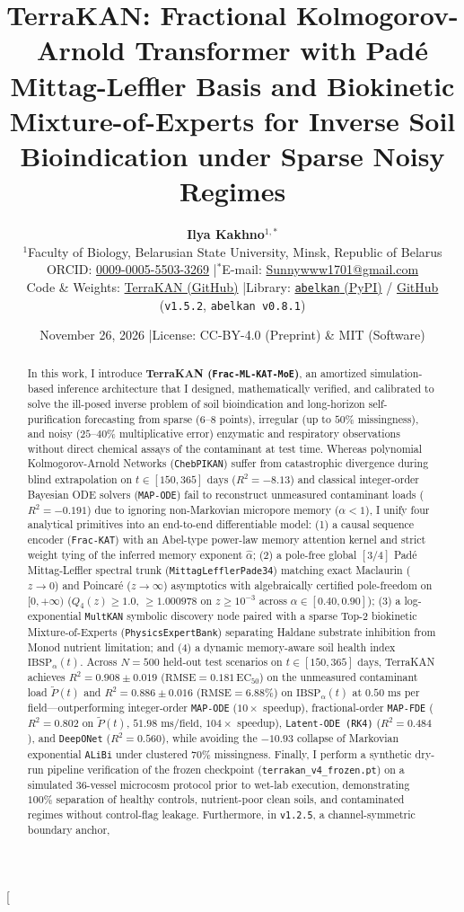 \documentclass[10pt,twocolumn,a4paper]{article}
\title{\vspace*{-7mm}\textbf{\Large TerraKAN: Fractional Kolmogorov-Arnold Transformer with Pad\'e Mittag-Leffler Basis and Biokinetic Mixture-of-Experts for Inverse Soil Bioindication under Sparse Noisy Regimes}}
\author{
  \textbf{Ilya Kakhno}$^{1,*}$ \\
  \small $^{1}$Faculty of Biology, Belarusian State University, Minsk, Republic of Belarus \\
  \small ORCID: \href{https://orcid.org/0009-0005-5503-3269}{0009-0005-5503-3269} \quad|\quad $^{*}$E-mail: \href{mailto:Sunnywww1701@gmail.com}{Sunnywww1701@gmail.com} \\
  \small Code \& Weights: \href{https://github.com/Lolycut/TerraKAN}{TerraKAN (GitHub)} \quad|\quad Library: \href{https://pypi.org/project/abelkan/}{\texttt{abelkan} (PyPI)} / \href{https://github.com/Lolycut/abelkan}{GitHub}  \quad (\texttt{v1.5.2}, \texttt{abelkan v0.8.1})
}
\date{\small November 26, 2026 \quad|\quad License: CC-BY-4.0 (Preprint) \& MIT (Software)}
\begin{document}
\twocolumn[
  \begin{@twocolumnfalse}
    \maketitle
    \vspace*{-4mm}
    \begin{abstract}
      \noindent
      In this work, I introduce \textbf{TerraKAN (\texttt{Frac-ML-KAT-MoE})}, an amortized simulation-based inference architecture that I designed, mathematically verified, and calibrated to solve the ill-posed inverse problem of soil bioindication and long-horizon self-purification forecasting from sparse ($6\text{--}8$ points), irregular (up to $50\%$ missingness), and noisy ($25\text{--}40\%$ multiplicative error) enzymatic and respiratory observations without direct chemical assays of the contaminant at test time. Whereas polynomial Kolmogorov-Arnold Networks (\texttt{ChebPIKAN}) suffer from catastrophic divergence during blind extrapolation on $t \in {[150, 365]}\text{ days}$ ($R^2 = -8.13$) and classical integer-order Bayesian ODE solvers (\texttt{MAP-ODE}) fail to reconstruct unmeasured contaminant loads ($R^2 = -0.191$) due to ignoring non-Markovian micropore memory ($\alpha < 1$), I unify four analytical primitives into an end-to-end differentiable model: (1) a causal sequence encoder (\texttt{Frac-KAT}) with an Abel-type power-law memory attention kernel and strict weight tying of the inferred memory exponent $\hat{\alpha}$; (2) a pole-free global ${[3/4]}$ Pad\'e Mittag-Leffler spectral trunk (\texttt{MittagLefflerPade34}) matching exact Maclaurin ($z \to 0$) and Poincar\'e ($z \to \infty$) asymptotics with algebraically certified pole-freedom on $[0, +\infty)$ ($Q_4(z) \ge 1.0$, $\ge 1.000978$ on $z \ge 10^{-3}$ across $\alpha \in {[0.40, 0.90]}$); (3) a log-exponential \texttt{MultKAN} symbolic discovery node paired with a sparse Top-2 biokinetic Mixture-of-Experts (\texttt{PhysicsExpertBank}) separating Haldane substrate inhibition from Monod nutrient limitation; and (4) a dynamic memory-aware soil health index $\text{IBSP}_\alpha(t)$. Across $N=500$ held-out test scenarios on $t \in {[150, 365]}\text{ days}$, TerraKAN achieves $R^2 = 0.908 \pm 0.019$ ($\text{RMSE} = 0.181\,\text{EC}_{50}$) on the unmeasured contaminant load $\tilde{P}(t)$ and $R^2 = 0.886 \pm 0.016$ ($\text{RMSE} = 6.88\%$) on $\text{IBSP}_\alpha(t)$ at $0.50\text{ ms}$ per field---outperforming integer-order \texttt{MAP-ODE} ($10\times$ speedup), fractional-order \texttt{MAP-FDE} ($R^2 = 0.802$ on $\tilde{P}(t)$, $51.98\text{ ms/field}$, $104\times$ speedup), \texttt{Latent-ODE (RK4)} ($R^2 = 0.484$), and \texttt{DeepONet} ($R^2 = 0.560$), while avoiding the $-10.93$ collapse of Markovian exponential \texttt{ALiBi} under clustered $70\%$ missingness. Finally, I perform a synthetic dry-run pipeline verification of the frozen checkpoint (\texttt{terrakan\_v4\_frozen.pt}) on a simulated 36-vessel microcosm protocol prior to wet-lab execution, demonstrating $100\%$ separation of healthy controls, nutrient-poor clean soils, and contaminated regimes without control-flag leakage. Furthermore, in \texttt{v1.2.5}, a channel-symmetric boundary anchor, 
\end{abstract}
\end{@twocolumnfalse}
\end{document}
